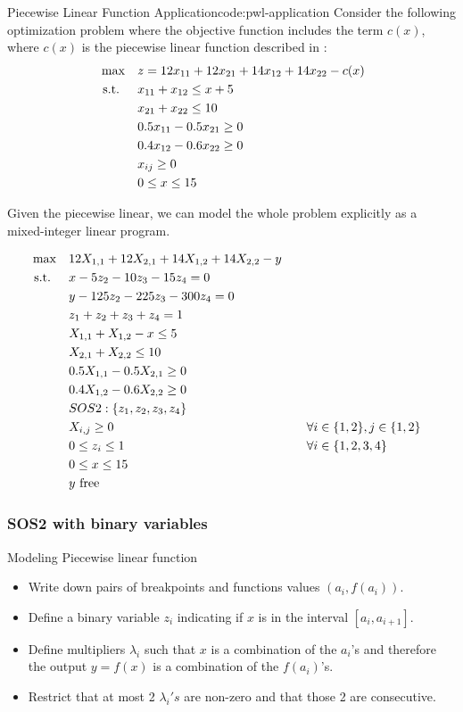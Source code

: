 \begin{examplewithcode}{Piecewise Linear Function Application}{code:pwl-application}
\label{example:pwl-application}
Consider the following optimization problem where the objective function includes the term $c(x)$, where $c(x)$ is the piecewise linear function described in :
\begin{align*}
\max \quad & z = 12x_{11} + 12x_{21} + 14x_{12} + 14x_{22} - c(x) \\
\mbox{ s.t. } \quad  & x_{11} + x_{12} \leq x + 5 \\
& x_{21} + x_{22} \leq 10 \\
& 0.5 x_{11} - 0.5x_{21} \geq 0 \\
& 0.4 x_{12} - 0.6 x_{22} \geq 0 \\
& x_{ij} \geq 0 \\
& 0 \leq x \leq 15
\end{align*}

Given the piecewise linear, we can model the whole problem explicitly as a mixed-integer linear program.

\begin{align*}
\max \quad & 12 X_{1,1} + 12 X_{2,1} + 14 X_{1,2} + 14 X_{2,2} - y\\
\mbox{ s.t. } \quad  & x - 5 z_{2} - 10 z_{3} - 15 z_{4} = 0\\
& y - 125 z_{2} - 225 z_{3} - 300 z_{4} = 0\\
& z_{1} + z_{2} + z_{3} + z_{4} = 1\\
& X_{1,1} + X_{1,2} - x \leq 5\\
& X_{2,1} + X_{2,2} \leq 10\\
& 0.5 X_{1,1} - 0.5 X_{2,1} \geq 0\\
& 0.4 X_{1,2} - 0.6 X_{2,2} \geq 0\\
& SOS2: \{z_1, z_2, z_3, z_4\}\\
& X_{i,j} \geq 0 &&\quad \forall i \in \{1,2\}, j \in \{1,2\}\\
& 0 \leq z_{i} \leq 1 &&\quad \forall i \in \{1,2,3,4\}\\
& 0 \leq x \leq 15\\
& y \mbox{ free}
\end{align*}
\end{examplewithcode}

\subsubsection{SOS2 with binary variables}

{Modeling Piecewise linear function}
\begin{itemize}
\item Write down pairs of breakpoints and functions values $(a_i, f(a_i))$.
\item Define a binary variable $z_i$ indicating if $x$ is in the interval $[a_i, a_{i+1}]$.
\item Define multipliers $\lambda_i$ such that $x$ is a combination of the $a_i$'s and therefore the output $y = f(x)$ is a combination of the $f(a_i)$'s.
\item Restrict that at most 2 $\lambda_i's$ are non-zero and that those 2 are consecutive.

\end{itemize}

